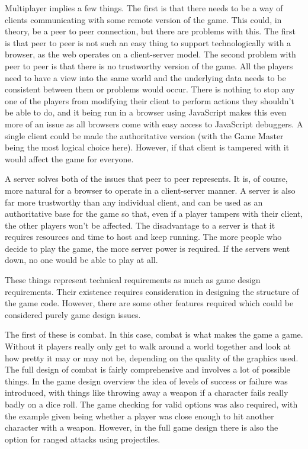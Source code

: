 Multiplayer implies a few things. The first is that there needs to be a way of clients communicating with some remote version of the game. This could, in theory, be a peer to peer connection, but there are problems with this. The first is that peer to peer is not such an easy thing to support technologically with a browser, as the web operates on a client-server model. The second problem with peer to peer is that there is no trustworthy version of the game. All the players need to have a view into the same world and the underlying data needs to be consistent between them or problems would occur. There is nothing to stop any one of the players from modifying their client to perform actions they shouldn't be able to do, and it being run in a browser using JavaScript makes this even more of an issue as all browsers come with easy access to JavaScript debuggers. A single client could be made the authoritative version (with the Game Master being the most logical choice here). However, if that client is tampered with it would affect the game for everyone.

A server solves both of the issues that peer to peer represents. It is, of course, more natural for a browser to operate in a client-server manner. A server is also far more trustworthy than any individual client, and can be used as an authoritative base for the game so that, even if a player tampers with their client, the other players won't be affected. The disadvantage to a server is that it requires resources and time to host and keep running. The more people who decide to play the game, the more server power is required. If the servers went down, no one would be able to play at all.

These things represent technical requirements as much as game design requirements. Their existence requires consideration in designing the structure of the game code. However, there are some other features required which could be considered purely game design issues.

The first of these is combat. In this case, combat is what makes the game a game. Without it players really only get to walk around a world together and look at how pretty it may or may not be, depending on the quality of the graphics used. The full design of combat is fairly comprehensive and involves a lot of possible things. In the game design overview the idea of levels of success or failure was introduced, with things like throwing away a weapon if a character fails really badly on a dice roll. The game checking for valid options was also required, with the example given being whether a player was close enough to hit another character with a weapon. However, in the full game design there is also the option for ranged attacks using projectiles.

